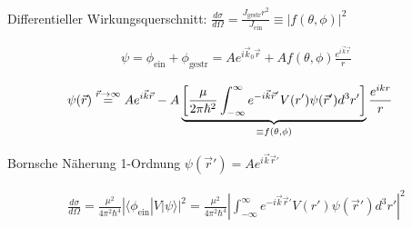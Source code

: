 




{\Huge
Differentieller Wirkungsquerschnitt: \( \frac{d\sigma}{d\Omega} = \frac{ J_{\text{gestr}}r^2 }{J_{\text{ein}}} \equiv |f(\theta,\phi)|^2 \)

\begin{align*}
  \psi = \phi_{\text{ein}}+ \phi_{\text{gestr}} = A e^{i\vec k_{0}\vec r} + A f(\theta,\phi)\frac{e^{i\vec k\vec r}}{r} 
\end{align*}

\begin{align*}
   \psi(\vec r) &\stackrel{\vec r\to \infty}=  Ae^{i\vec k \vec r}  - A \underbr{\left[\frac{\mu}{2\pi\hbar^2}\int_{-\infty}^\infty e^{- i\vec k\vec r' }  V(r') \psi(\vec r') d^3 r'\right]}_{ \equiv  f(\theta,\phi)  } \frac{ e^{i kr }}{r} 
\end{align*}

Bornsche Näherung 1-Ordnung \(\psi(\vec r')=Ae^{i\vec k\vec r'}\)

\begin{align*}
  \frac{d\sigma}{d\Omega}= \frac{\mu^2}{4\pi^2\hbar^4} |\langle\phi_{\text{ein}}|  V |\psi\rangle |^2 = \frac{\mu^2}{4\pi^2\hbar^4} \left| \int_{-\infty}^\infty e^{- i\vec k\vec r' }  V(r') \psi(\vec r') d^3 r' \right|^2
\end{align*}

}%

